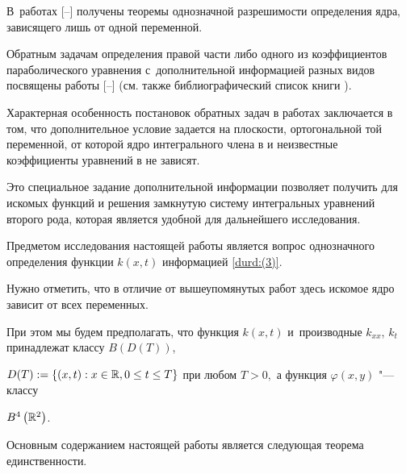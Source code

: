 В~работах  [--]  получены теоремы однозначной разрешимости определения   ядра,  зависящего  лишь от одной переменной.  

Обратным задачам определения правой части либо одного из коэффициентов параболического уравнения с~дополнительной информацией разных видов посвящены работы [--] (см. также библиографический список книги \cite{durd:7}).

Характерная особенность постановок обратных задач в  работах \cite{durd:1, durd:11, durd:12}  заключается в том, что дополнительное условие  задается на плоскости, ортогональной той переменной, от которой ядро интегрального члена в \cite{durd:1} и неизвестные коэффициенты  уравнений в \cite{durd:11, durd:12} не зависят. 

Это специальное задание дополнительной информации позволяет получить для искомых функций и решения замкнутую систему интегральных уравнений второго рода, которая является удобной для дальнейшего исследования.



Предметом исследования настоящей работы является вопрос однозначного определения функции $k(x,t)$ информацией \eqref{durd:(3)}.

Нужно отметить, что в отличие от вышеупомянутых работ  здесь искомое ядро зависит от всех переменных.  

При этом мы будем предполагать, что функция $k(x,t)$ и~производные $k_{xx}$, $k_{t}$ принадлежат классу $B(D(T))$,


$D(T):=\left\{(x,t): x\in {\Bbb R}, 0\leq t \leq T\right\}$ при любом $T>0,$ а функция $\varphi(x,y)$  "--- классу

$B^4\left({\Bbb R}^2\right)$.




Основным содержанием настоящей работы является следующая теорема единственности.



\smallskip



